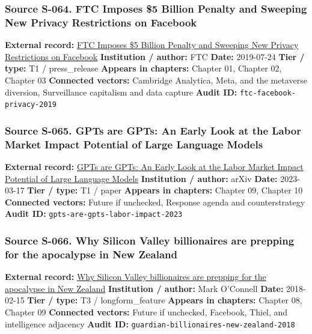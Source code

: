 \documentclass[
  american,
  11pt,
  letterpaper,
]{article}
\begin{document}
\subsubsection{Source S-064. FTC Imposes \$5 Billion Penalty and
Sweeping New Privacy Restrictions on
Facebook}\label{source-s-064-ftc-imposes-5-billion-penalty-and-sweeping-new-privacy-restrictions-on-facebook}

\textbf{External record:}
\href{https://www.ftc.gov/news-events/news/press-releases/2019/07/ftc-imposes-5-billion-penalty-sweeping-new-privacy-restrictions-facebook}{FTC
Imposes \$5 Billion Penalty and Sweeping New Privacy Restrictions on
Facebook} \textbf{Institution / author:} FTC \textbf{Date:} 2019-07-24
\textbf{Tier / type:} T1 / press\_release \textbf{Appears in chapters:}
Chapter 01, Chapter 02, Chapter 03 \textbf{Connected vectors:} Cambridge
Analytica, Meta, and the metaverse diversion, Surveillance capitalism
and data capture \textbf{Audit ID:} \texttt{ftc-facebook-privacy-2019}

\subsubsection{Source S-065. GPTs are GPTs: An Early Look at the Labor
Market Impact Potential of Large Language
Models}\label{source-s-065-gpts-are-gpts-an-early-look-at-the-labor-market-impact-potential-of-large-language-models}

\textbf{External record:} \href{https://arxiv.org/abs/2303.10130}{GPTs
are GPTs: An Early Look at the Labor Market Impact Potential of Large
Language Models} \textbf{Institution / author:} arXiv \textbf{Date:}
2023-03-17 \textbf{Tier / type:} T1 / paper \textbf{Appears in
chapters:} Chapter 09, Chapter 10 \textbf{Connected vectors:} Future if
unchecked, Response agenda and counterstrategy \textbf{Audit ID:}
\texttt{gpts-are-gpts-labor-impact-2023}

\subsubsection{Source S-066. Why Silicon Valley billionaires are
prepping for the apocalypse in New
Zealand}\label{source-s-066-why-silicon-valley-billionaires-are-prepping-for-the-apocalypse-in-new-zealand}

\textbf{External record:}
\href{https://www.theguardian.com/news/2018/feb/15/why-silicon-valley-billionaires-are-prepping-for-the-apocalypse-in-new-zealand}{Why
Silicon Valley billionaires are prepping for the apocalypse in New
Zealand} \textbf{Institution / author:} Mark O'Connell \textbf{Date:}
2018-02-15 \textbf{Tier / type:} T3 / longform\_feature \textbf{Appears
in chapters:} Chapter 08, Chapter 09 \textbf{Connected vectors:} Future
if unchecked, Facebook, Thiel, and intelligence adjacency \textbf{Audit
ID:} \texttt{guardian-billionaires-new-zealand-2018}
\end{document}

